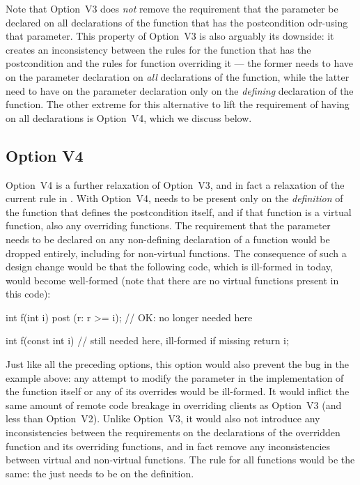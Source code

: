 Note that Option~V3 does \emph{not} remove the requirement that the parameter be declared  on all declarations of the function that has the postcondition odr-using that parameter. This property of Option~V3 is also arguably its downside: it creates an inconsistency between the rules for the function that has the postcondition and the rules for function overriding it --- the former needs to have  on the parameter declaration on \emph{all} declarations of the function, while the latter need to have  on the parameter declaration only on the \emph{defining} declaration of the function. The other extreme for this alternative to lift the requirement of having  on all declarations is Option~V4, which we discuss below.

\subsection*{Option V4}

Option~V4 is a further relaxation of Option~V3, and in fact a relaxation of the current rule in \cite{P2900R10}. With Option~V4,  needs to be present only on the \emph{definition} of the function that defines the postcondition itself, and if that function is a virtual function, also any overriding functions. The requirement that the parameter needs to be declared  on any non-defining declaration of a function would be dropped entirely, including for non-virtual functions. The consequence of such a design change would be that the following code, which is ill-formed in \cite{P2900R10} today, would become well-formed (note that there are no virtual functions present in this code):

\begin{codeblock}
int f(int i) post (r: r >=  i);  // OK:  no longer needed here

int f(const int i) {  //  still needed here, ill-formed if missing
  return i;
}
\end{codeblock}
Just like all the preceding options, this option would also prevent the bug in the example above: any attempt to modify the parameter in the implementation of the function itself or any of its overrides would be ill-formed. It would inflict the same amount of remote code breakage in overriding clients as Option~V3 (and less than Option~V2). Unlike Option~V3, it would also not introduce any inconsistencies between the requirements on the declarations of the overridden function and its overriding functions, and in fact remove any inconsistencies between virtual and non-virtual functions. The rule for all functions would be the same: the  just needs to be on the definition.

